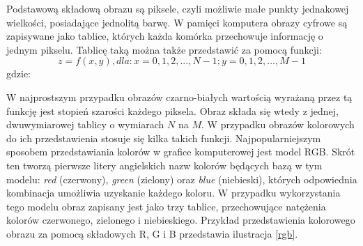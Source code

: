 Podstawową składową obrazu są piksele, czyli możliwie małe punkty jednakowej wielkości, posiadające jednolitą barwę. W pamięci komputera obrazy cyfrowe są zapisywane jako tablice, których każda komórka przechowuje informację o jednym pikselu. Tablicę taką można także przedstawić za pomocą funkcji:
\begin{equation}
	z = f(x,y), dla: x = 0, 1, 2, ..., N-1; y = 0, 1, 2, ..., M-1
   \label{funkcja_obrazu}
 \end{equation}
 gdzie:  
 \begin{equationDescriptor}
 \end{equationDescriptor}
 
W najprostszym przypadku obrazów czarno-białych wartością wyrażaną przez tą funkcję jest stopień szarości każdego piksela. Obraz składa się wtedy z jednej, dwuwymiarowej tablicy o wymiarach $N$ na $M$.
W przypadku obrazów kolorowych do ich przedstawienia stosuje się kilka takich funkcji. Najpopularniejszym sposobem przedstawiania kolorów w grafice komputerowej jest model RGB. Skrót ten tworzą pierwsze litery angielskich nazw kolorów będących bazą w tym modelu: \textit{red} (czerwony), \textit{green} (zielony) oraz \textit{blue} (niebieski), których odpowiednia kombinacja umożliwia uzyskanie każdego koloru. W przypadku wykorzystania tego modelu obraz zapisany jest jako trzy tablice, przechowujące natężenia kolorów czerwonego, zielonego i niebieskiego. Przykład przedstawienia kolorowego obrazu za pomocą składowych R, G i B przedstawia ilustracja \ref{rgb}.

